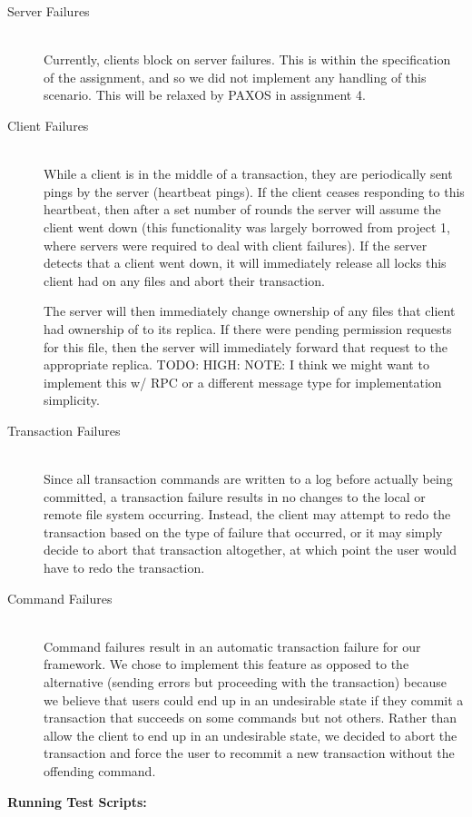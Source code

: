 \documentclass[11pt]{article}
\begin{document}
\begin{description}
\item[Server Failures] \\ Currently, clients block on server failures. This is within the specification of the assignment, and so we did not implement any handling of this scenario. This will be relaxed by PAXOS in assignment 4.
\item[Client Failures] \\ While a client is in the middle of a transaction, they are periodically sent pings by the server (heartbeat pings). If the client ceases responding to this heartbeat, then after a set number of rounds the server will assume the client went down (this functionality was largely borrowed from project 1, where servers were required to deal with client failures). If the server detects that a client went down, it will immediately release all locks this client had on any files and abort their transaction.

The server will then immediately change ownership of any files that client had ownership of to its replica. If there were pending permission requests for this file, then the server will immediately forward that request to the appropriate replica. TODO: HIGH: NOTE: I think we might want to implement this w/ RPC or a different message type for implementation simplicity.
\item[Transaction Failures] \\ Since all transaction commands are written to a log before actually being committed, a transaction failure results in no changes to the local or remote file system occurring. Instead, the client
may attempt to redo the transaction based on the type of failure that occurred, or it may simply decide to abort that transaction altogether, at which point the user would have to redo the transaction. 
\item[Command Failures] \\ Command failures result in an automatic transaction failure for our framework. We chose to implement this feature as opposed to the alternative (sending errors but proceeding with the transaction) because we believe that users could end up in an undesirable state if they commit a transaction that succeeds on some commands but not others. Rather than allow the client to end up in an undesirable state, we decided to abort the transaction and force the user to recommit a new transaction without the offending command.


\end{description}
\textbf{Running Test Scripts:}\\
\end{document}
